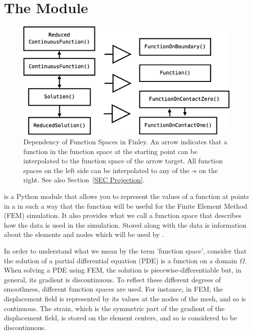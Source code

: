 
%
%
%


\chapter{The Module \escript}
\label{ESCRIPT CHAP}


\begin{figure}
\includegraphics[width=\textwidth]{figures/EscriptDiagram1}
\caption{\label{ESCRIPT DEP}Dependency of Function Spaces in Finley. An arrow indicates that a function in the 
function space at the starting point can be interpolated to the function space of the arrow target.
All function spaces on the left side can be interpolated to any of the \FunctionSpace-s on the right.
See also Section~\ref{SEC Projection}.}
\end{figure}

\escript is a Python module that allows you to represent the values of
a function at points in a \Domain in such a way that the function will
be useful for the Finite Element Method (FEM) simulation.  It also
provides what we call a function space that describes how the data is
used in the simulation.  Stored along with the data is information
about the elements and nodes which will be used by \finley.

In order to understand what we mean by the term 'function space',
consider that the solution of a partial differential equation
 (PDE) is a function on a domain
$\Omega$.  When solving a PDE using FEM, the solution is
piecewise-differentiable but, in general, its gradient is
discontinuous.  To reflect these different degrees of smoothness,
different function spaces are used.  For instance, in FEM, the
displacement field is represented by its values at the nodes of the
mesh, and so is continuous.  The strain, which is the symmetric
part of the gradient of the displacement field, is stored on the
element centers, and so is considered to be discontinuous.

